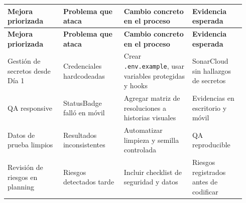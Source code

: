 \documentclass[11pt,a4paper]{article}
\begin{document}
\begingroup
\scriptsize
\setlength{\tabcolsep}{3pt}
\begin{longtable}{P{0.22\linewidth}P{0.24\linewidth}P{0.27\linewidth}P{0.21\linewidth}}
\toprule
\textbf{Mejora priorizada} & \textbf{Problema que ataca} & \textbf{Cambio concreto en el proceso} & \textbf{Evidencia esperada} \\
\midrule
\endfirsthead
\toprule
\textbf{Mejora priorizada} & \textbf{Problema que ataca} & \textbf{Cambio concreto en el proceso} & \textbf{Evidencia esperada} \\
\midrule
\endhead
\bottomrule
\endlastfoot
Gestión de secretos desde Día 1 & Credenciales hardcodeadas & Crear \texttt{.env.example}, usar variables protegidas y hooks & SonarCloud sin hallazgos de secretos \\
QA responsive & StatusBadge falló en móvil & Agregar matriz de resoluciones a historias visuales & Evidencias en escritorio y móvil \\
Datos de prueba limpios & Resultados inconsistentes & Automatizar limpieza y semilla controlada & QA reproducible \\
Revisión de riesgos en planning & Riesgos detectados tarde & Incluir checklist de seguridad y datos & Riesgos registrados antes de codificar \\
\end{longtable}
\endgroup
\end{document}

